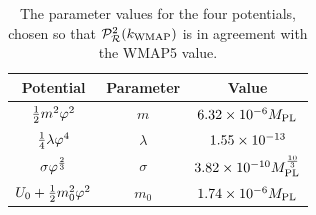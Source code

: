 \begin{table}[htb]
\begin{center}
\begin{tabular}{ccc}
\toprule
Potential & Parameter & Value\\
\midrule
$\frac{1}{2} m^2 \varphi^2$ & $m$ & $6.32\times 10^{-6}M_{\mathrm{PL}}$\\
$\frac{1}{4}\lambda\varphi^4$ & $\lambda$ & $1.55\times 10^{-13}$\\
$\sigma\varphi^{\frac{2}{3}}$ & $\sigma$ & $3.82\times 10^{-10}M_{\mathrm{PL}}^{\frac{10}{3}}$\\
$U_0 + \frac{1}{2} m_0^2 \varphi^2$ & $m_0$ & $1.74\times 10^{-6}M_{\mathrm{PL}}$\\
\bottomrule
\end{tabular}
\caption[Parameter values]{The parameter values for the four potentials, chosen so
that $\mathcal{P}_{\mathcal{R}}^2 (k_\mathrm{WMAP})$ is in agreement with the WMAP5 value.}
\label{tab:params-num}
\end{center}
% 
\end{table}

